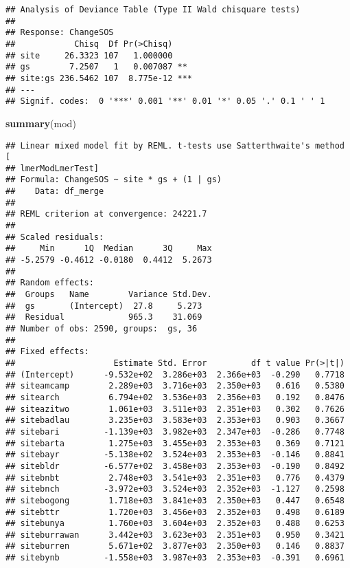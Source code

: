 \documentclass[
]{article}
\newenvironment{Shaded}{\begin{snugshade}}{\end{snugshade}}
\newcommand{\KeywordTok}[1]{\textcolor[rgb]{0.13,0.29,0.53}{\textbf{#1}}}
\newcommand{\NormalTok}[1]{#1}
\begin{document}
\begin{verbatim}
## Analysis of Deviance Table (Type II Wald chisquare tests)
## 
## Response: ChangeSOS
##            Chisq  Df Pr(>Chisq)    
## site     26.3323 107   1.000000    
## gs        7.2507   1   0.007087 ** 
## site:gs 236.5462 107  8.775e-12 ***
## ---
## Signif. codes:  0 '***' 0.001 '**' 0.01 '*' 0.05 '.' 0.1 ' ' 1
\end{verbatim}

\begin{Shaded}
\begin{Highlighting}[]
\KeywordTok{summary}\NormalTok{(mod)}
\end{Highlighting}
\end{Shaded}

\begin{verbatim}
## Linear mixed model fit by REML. t-tests use Satterthwaite's method [
## lmerModLmerTest]
## Formula: ChangeSOS ~ site * gs + (1 | gs)
##    Data: df_merge
## 
## REML criterion at convergence: 24221.7
## 
## Scaled residuals: 
##     Min      1Q  Median      3Q     Max 
## -5.2579 -0.4612 -0.0180  0.4412  5.2673 
## 
## Random effects:
##  Groups   Name        Variance Std.Dev.
##  gs       (Intercept)  27.8     5.273  
##  Residual             965.3    31.069  
## Number of obs: 2590, groups:  gs, 36
## 
## Fixed effects:
##                    Estimate Std. Error         df t value Pr(>|t|)  
## (Intercept)      -9.532e+02  3.286e+03  2.366e+03  -0.290   0.7718  
## siteamcamp        2.289e+03  3.716e+03  2.350e+03   0.616   0.5380  
## sitearch          6.794e+02  3.536e+03  2.356e+03   0.192   0.8476  
## siteazitwo        1.061e+03  3.511e+03  2.351e+03   0.302   0.7626  
## sitebadlau        3.235e+03  3.583e+03  2.353e+03   0.903   0.3667  
## sitebari         -1.139e+03  3.982e+03  2.347e+03  -0.286   0.7748  
## sitebarta         1.275e+03  3.455e+03  2.353e+03   0.369   0.7121  
## sitebayr         -5.138e+02  3.524e+03  2.353e+03  -0.146   0.8841  
## sitebldr         -6.577e+02  3.458e+03  2.353e+03  -0.190   0.8492  
## sitebnbt          2.748e+03  3.541e+03  2.351e+03   0.776   0.4379  
## sitebnch         -3.972e+03  3.524e+03  2.352e+03  -1.127   0.2598  
## sitebogong        1.718e+03  3.841e+03  2.350e+03   0.447   0.6548  
## sitebttr          1.720e+03  3.456e+03  2.352e+03   0.498   0.6189  
## sitebunya         1.760e+03  3.604e+03  2.352e+03   0.488   0.6253  
## siteburrawan      3.442e+03  3.623e+03  2.351e+03   0.950   0.3421  
## siteburren        5.671e+02  3.877e+03  2.350e+03   0.146   0.8837  
## sitebynb         -1.558e+03  3.987e+03  2.353e+03  -0.391   0.6961  

\end{verbatim}
\end{document}

